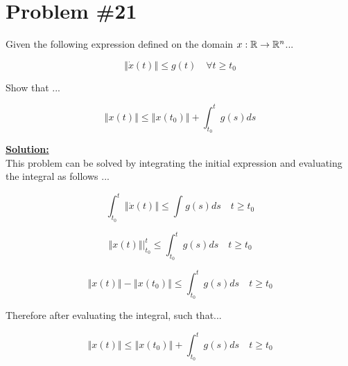 
\section*{Problem \#21}

Given the following expression defined on the domain $x: \mathbb{R} \to \mathbb{R}^n$...

$$
\left\Vert \dot{x}(t) \right\Vert \leq g(t) \quad \forall t \geq t_0
$$

\noindent Show that ...

$$
\left\Vert x(t) \right\Vert \leq \left\Vert x(t_0) \right\Vert + \int_{t_0}^{t}g(s)ds
$$


\noindent \underline{\textbf{Solution: }} \\

\noindent This problem can be solved by integrating the initial expression and evaluating the integral as follows ...

$$
\int_{t_0}^{t} \left\Vert \dot{x}(t) \right\Vert \leq \int_{}^{}g(s)ds \quad t \geq t_0
$$


$$
\left\Vert x(t) \right\Vert \biggr\rvert_{t_0}^{t} \leq \int_{t_0}^{t}g(s)ds \quad t \geq t_0
$$


$$
\left\Vert x(t)  \right\Vert - \left\Vert x(t_0) \right\Vert \leq \int_{t_0}^{t}g(s)ds \quad t \geq t_0
$$

\noindent Therefore after evaluating the integral, such that...

$$
\left\Vert x(t)  \right\Vert \leq \left\Vert x(t_0) \right\Vert + \int_{t_0}^{t}g(s)ds \quad t \geq t_0
$$
